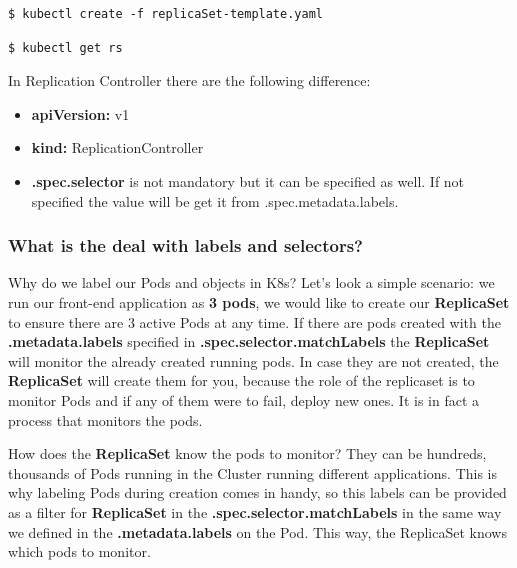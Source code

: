 \documentclass{article}
\newenvironment{blocktemplateI}[1]{%
    \tcolorbox[beamer,%
    noparskip,breakable,
    colframe=Violet,%
    colbacklower=Black,%
    title=#1]}%
    {\endtcolorbox}
\newenvironment{codetemplate}[1][]{%
  \mybasecolorbox[#1]
  \itshape
}{%
  \endmybasecolorbox
}
\begin{document}
\begin{codetemplate}
\begin{verbatim}
$ kubectl create -f replicaSet-template.yaml
\end{verbatim}
\end{codetemplate}

\begin{codetemplate}
\begin{verbatim}
$ kubectl get rs
\end{verbatim}
\end{codetemplate}

\begin{blocktemplateI}{Note}
In Replication Controller there are the following difference:

\begin{itemize}
    \item \textbf{apiVersion:} v1
    \item \textbf{kind:} ReplicationController
    \item \textbf{.spec.selector} is not mandatory but it can be specified as well. If not specified the value will be get it from .spec.metadata.labels.
\end{itemize}
\end{blocktemplateI}

\subsubsection{What is the deal with labels and selectors?}

Why do we label our Pods and objects in K8s? Let's look a simple scenario: we run our front-end application as \textbf{3 pods}, we would like to create our \textbf{ReplicaSet} to ensure there are 3 active Pods at any time. If there are pods created with the \textbf{.metadata.labels} specified in \textbf{.spec.selector.matchLabels} the \textbf{ReplicaSet} will monitor the already created running pods. In case they are not created, the \textbf{ReplicaSet} will create them for you, because the role of the replicaset is to monitor Pods and if any of them were to fail, deploy new ones. It is in fact a process that monitors the pods.

How does the \textbf{ReplicaSet} know the pods to monitor? They can be hundreds, thousands of Pods running in the Cluster running different applications. This is why labeling Pods during creation comes in handy, so this labels can be provided as a filter for \textbf{ReplicaSet} in the \textbf{.spec.selector.matchLabels} in the same way we defined in the \textbf{.metadata.labels} on the Pod. This way, the ReplicaSet knows which pods to monitor.
\end{document}
